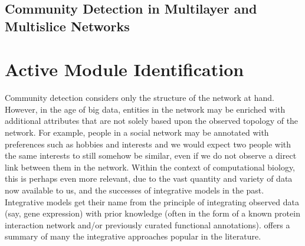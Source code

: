 \documentclass{report}
\begin{document}
	
	
	\subsection{Community Detection in Multilayer and Multislice Networks}
	
	\section{Active Module Identification}
	
	Community detection considers only the structure of the network at hand. However, in the age of big data, entities in the network may be enriched with additional attributes that are not solely based upon the observed topology of the network. For example, people in a social network may be annotated with preferences such as hobbies and interests and we would expect two people with the same interests to still somehow be similar, even if we do not observe a direct link between them in the network. Within the context of computational biology, this is perhaps even more relevant, due to the vast quantity and variety of data now available to us, and the successes of integrative models in the past. Integrative models get their name from the principle of integrating observed data (say, gene expression) with prior knowledge (often in the form of a known protein interaction network and/or previously curated functional annotations). \cite{mitra2013integrative} offers a summary of many the integrative approaches popular in the literature.
	
\end{document}
